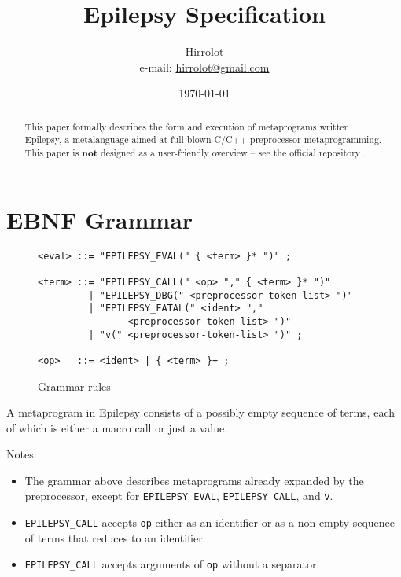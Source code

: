\documentclass[12pt]{article}
\theoremstyle{break}
\begin{document}
\title{Epilepsy Specification}
\date{\today}
\author{Hirrolot \\ e-mail: \href{mailto:hirrolot@gmail.com}{hirrolot@gmail.com}}
\maketitle

\begin{abstract}
This paper formally describes the form and execution of metaprograms written
Epilepsy, a metalanguage aimed at full-blown C/C++ preprocessor metaprogramming. This paper
is \textbf{not} designed as a user-friendly overview -- see the official repository
\cite{Epilepsy}.
\end{abstract}

\tableofcontents

\newpage

\section{EBNF Grammar}

\begin{figure}[H]
    \caption{Grammar rules}

\begin{verbatim}
<eval> ::= "EPILEPSY_EVAL(" { <term> }* ")" ;

<term> ::= "EPILEPSY_CALL(" <op> "," { <term> }* ")"
         | "EPILEPSY_DBG(" <preprocessor-token-list> ")"
         | "EPILEPSY_FATAL(" <ident> ","
                <preprocessor-token-list> ")"
         | "v(" <preprocessor-token-list> ")" ;

<op>   ::= <ident> | { <term> }+ ;
\end{verbatim}

\end{figure}

A metaprogram in Epilepsy consists of a possibly empty sequence of terms, each of which
is either a macro call or just a value.

Notes:

\begin{itemize}
    \item The grammar above describes metaprograms already expanded by the preprocessor,
    except for \texttt{EPILEPSY\_EVAL}, \texttt{EPILEPSY\_CALL}, and \texttt{v}.
    \item \texttt{EPILEPSY\_CALL} accepts \texttt{op} either as an identifier or as a non-empty
    sequence of terms that reduces to an identifier.
    \item \texttt{EPILEPSY\_CALL} accepts arguments of \texttt{op} without a separator.
\end{itemize}
\end{document}
